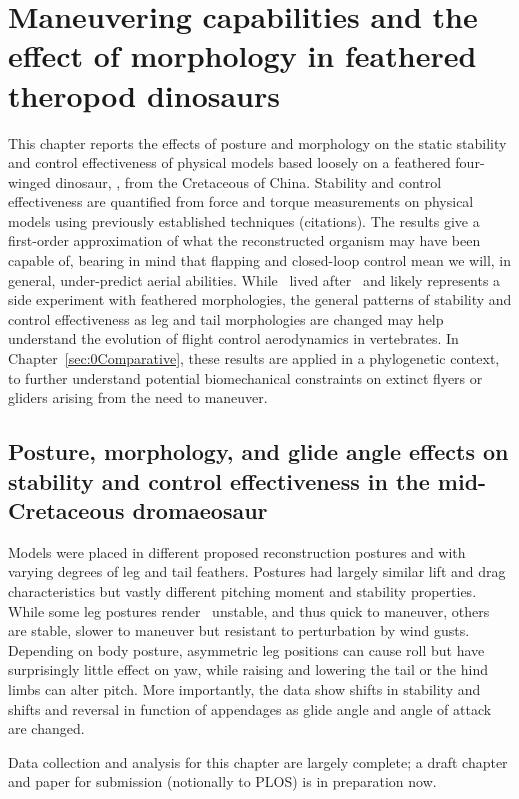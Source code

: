 \section{Maneuvering capabilities and the effect of morphology in feathered theropod dinosaurs}
\label{sec:0Microraptor}
This chapter reports the effects of posture and morphology on the static stability and control effectiveness of physical models based loosely on a feathered four-winged dinosaur, \Microraptorgui \citep{Xu:2003}, from the Cretaceous of China.   Stability and control effectiveness are quantified from force and torque measurements on physical models using previously established techniques (citations).  The results give a first-order approximation of what the reconstructed organism may have been capable of, bearing in mind that flapping and closed-loop control mean we will, in general, under-predict aerial abilities.  While \Mgui\ lived after \Archaeopteryx\ and likely represents a side experiment with feathered morphologies, the general patterns of stability and control effectiveness as leg and tail morphologies are changed may help understand the evolution of flight control aerodynamics in vertebrates.  In Chapter~\ref{sec:0Comparative}, these results are applied in a phylogenetic context, to further understand potential biomechanical constraints on extinct flyers or gliders arising from the need to maneuver. 

\subsection{Posture, morphology, and glide angle effects on stability and control effectiveness in the mid-Cretaceous dromaeosaur \Microraptorgui}
Models were placed in different proposed reconstruction postures and with varying degrees of leg and tail feathers.  Postures had largely similar lift and drag characteristics but vastly different pitching moment and stability properties.  While some leg postures render \Mgui\ unstable, and thus quick to maneuver, others are stable, slower to maneuver but resistant to perturbation by wind gusts.  Depending on body posture, asymmetric leg positions can cause roll but have surprisingly little effect on yaw, while raising and lowering the tail or the hind limbs can alter pitch.  More importantly, the data show shifts in stability and shifts and reversal in function of appendages as glide angle and angle of attack are changed.  

Data collection and analysis for this chapter are largely complete; a draft chapter and paper for submission (notionally to PLOS) is in preparation now. 

